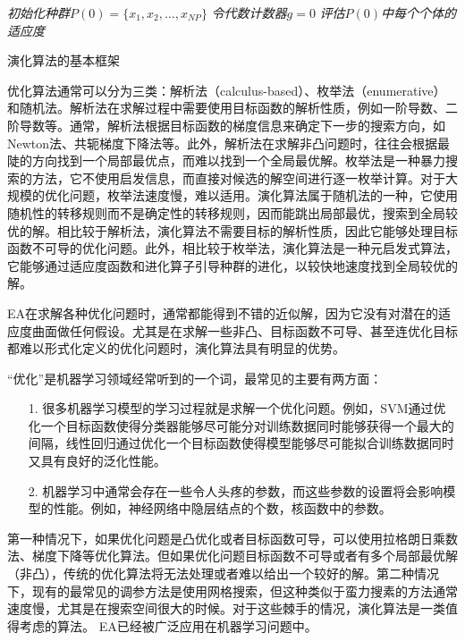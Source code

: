 \IncMargin{1em}
\begin{algorithm}
\emph{初始化种群$P(0) = \{x_{1},x_{2},\dots ,x_{NP}\}$}\;
\emph{令代数计数器$g = 0$}\;
\emph{评估$P(0)$中每个个体的适应度}\;
\caption{演化算法的基本框架}\label{alg_EA}
\end{algorithm}\DecMargin{1em}

优化算法通常可以分为三类：解析法（calculus-based）、枚举法（enumerative）和随机法\citep{潘正君1998演化计算}。解析法在求解过程中需要使用目标函数的解析性质，例如一阶导数、二阶导数等。通常，解析法根据目标函数的梯度信息来确定下一步的搜索方向，如Newton法、共轭梯度下降法等。此外，解析法在求解非凸问题时，往往会根据最陡的方向找到一个局部最优点，而难以找到一个全局最优解。枚举法是一种暴力搜索的方法，它不使用启发信息，而直接对候选的解空间进行逐一枚举计算。对于大规模的优化问题，枚举法速度慢，难以适用。演化算法属于随机法的一种，它使用随机性的转移规则而不是确定性的转移规则，因而能跳出局部最优，搜索到全局较优的解。相比较于解析法，演化算法不需要目标的解析性质，因此它能够处理目标函数不可导的优化问题。此外，相比较于枚举法，演化算法是一种元启发式算法，它能够通过适应度函数和进化算子引导种群的进化，以较快地速度找到全局较优的解。

EA在求解各种优化问题时，通常都能得到不错的近似解，因为它没有对潜在的适应度曲面做任何假设。尤其是在求解一些非凸、目标函数不可导、甚至连优化目标都难以形式化定义的优化问题时，演化算法具有明显的优势。

“优化”是机器学习领域经常听到的一个词，最常见的主要有两方面：
\begin{enumerate}
\item[1.]很多机器学习模型的学习过程就是求解一个优化问题。例如，SVM通过优化一个目标函数使得分类器能够尽可能分对训练数据同时能够获得一个最大的间隔，线性回归通过优化一个目标函数使得模型能够尽可能拟合训练数据同时又具有良好的泛化性能。
\item[2.]机器学习中通常会存在一些令人头疼的参数，而这些参数的设置将会影响模型的性能。例如，神经网络中隐层结点的个数，核函数中的参数。
\end{enumerate}
第一种情况下，如果优化问题是凸优化或者目标函数可导，可以使用拉格朗日乘数法、梯度下降等优化算法。但如果优化问题目标函数不可导或者有多个局部最优解（非凸），传统的优化算法将无法处理或者难以给出一个较好的解。第二种情况下，现有的最常见的调参方法是使用网格搜索，但这种类似于蛮力搜素的方法通常速度慢，尤其是在搜索空间很大的时候。对于这些棘手的情况，演化算法是一类值得考虑的算法。
EA已经被广泛应用在机器学习问题中\citep{liu2000evolutionary}\citep{tang2005linear}\citep{liu2000ensemble}。


